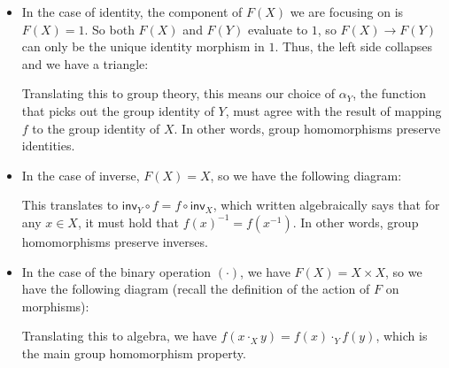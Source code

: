\documentclass{article}
\theoremstyle{plain}
\theoremstyle{definition}
\begin{document}
\begin{itemize}
\item In the case of identity, the component of \ensuremath{F\left( X \right)} we are focusing on is \ensuremath{F\left( X \right) = 1}. So both \ensuremath{F\left( X \right)} and \ensuremath{F\left( Y \right)} evaluate to \ensuremath{1}, so \ensuremath{F\left( X \right) \rightarrow F\left( Y \right)} can only be the unique identity morphism in \ensuremath{1}. Thus, the left side collapses and we have a triangle: 
\begin{center}
\end{center}
 Translating this to group theory, this means our choice of \ensuremath{{\alpha }_{Y}}, the function that picks out the group identity of \ensuremath{Y}, must agree with the result of mapping \ensuremath{f} to the group identity of \ensuremath{X}. In other words, group homomorphisms preserve identities.
\item In the case of inverse, \ensuremath{F\left( X \right) = X}, so we have the following diagram: 
\begin{center}
\end{center}
 This translates to \ensuremath{{\mathsf{inv}}_{Y} \circ f = f \circ {\mathsf{inv}}_{X}}, which written algebraically says that for any \ensuremath{x \in X}, it must hold that \ensuremath{{f\left( x \right)}^{-1} = f\left( {x}^{-1} \right)}. In other words, group homomorphisms preserve inverses.
\item In the case of the binary operation \ensuremath{\left( \cdot \right)}, we have \ensuremath{F\left( X \right) = X \times X}, so we have the following diagram (recall the definition of the action of \ensuremath{F} on morphisms): 
\begin{center}
\end{center}
 Translating this to algebra, we have \ensuremath{f\left( x {\cdot }_{X} y \right) = f\left( x \right) {\cdot }_{Y} f\left( y \right)}, which is the main group homomorphism property.
\end{itemize}
\end{document}
